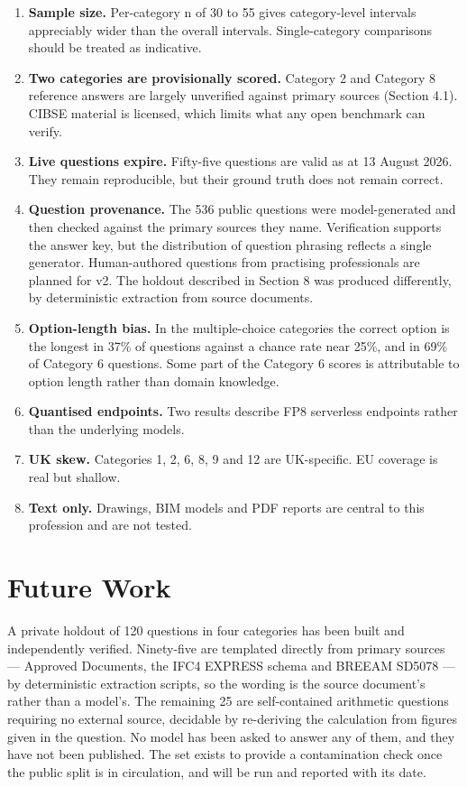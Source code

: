 \documentclass[11pt,a4paper]{article}
\begin{document}
\begin{enumerate}
\item \textbf{Sample size.} Per-category n of 30 to 55 gives category-level intervals appreciably wider than the overall intervals. Single-category comparisons should be treated as indicative.
\item \textbf{Two categories are provisionally scored.} Category 2 and Category 8 reference answers are largely unverified against primary sources (Section 4.1). CIBSE material is licensed, which limits what any open benchmark can verify.
\item \textbf{Live questions expire.} Fifty-five questions are valid as at 13 August 2026. They remain reproducible, but their ground truth does not remain correct.
\item \textbf{Question provenance.} The 536 public questions were model-generated and then checked against the primary sources they name. Verification supports the answer key, but the distribution of question phrasing reflects a single generator. Human-authored questions from practising professionals are planned for v2. The holdout described in Section 8 was produced differently, by deterministic extraction from source documents.
\item \textbf{Option-length bias.} In the multiple-choice categories the correct option is the longest in 37\% of questions against a chance rate near 25\%, and in 69\% of Category 6 questions. Some part of the Category 6 scores is attributable to option length rather than domain knowledge.
\item \textbf{Quantised endpoints.} Two results describe FP8 serverless endpoints rather than the underlying models.
\item \textbf{UK skew.} Categories 1, 2, 6, 8, 9 and 12 are UK-specific. EU coverage is real but shallow.
\item \textbf{Text only.} Drawings, BIM models and PDF reports are central to this profession and are not tested.
\end{enumerate}


\section{Future Work}

A private holdout of 120 questions in four categories has been built and independently verified. Ninety-five are templated directly from primary sources --- Approved Documents, the IFC4 EXPRESS schema and BREEAM SD5078 --- by deterministic extraction scripts, so the wording is the source document's rather than a model's. The remaining 25 are self-contained arithmetic questions requiring no external source, decidable by re-deriving the calculation from figures given in the question. No model has been asked to answer any of them, and they have not been published. The set exists to provide a contamination check once the public split is in circulation, and will be run and reported with its date.
\end{document}
